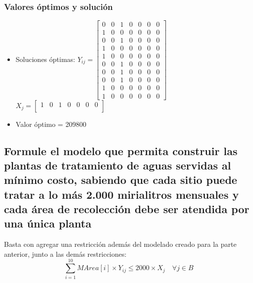 \documentclass[a4paper,12pt]{article}
\begin{document}
\subsubsection{Valores óptimos y solución}
\begin{itemize}
	\item Soluciones óptimas: $Y_{ij}=
	\begin{bmatrix}
	0 & 0 & 1 & 0 & 0 & 0 & 0\\
	1 & 0 & 0 & 0 & 0 & 0 & 0\\
	0 & 0 & 1 & 0 & 0 & 0 & 0\\
	1 & 0 & 0 & 0 & 0 & 0 & 0\\
	1 & 0 & 0 & 0 & 0 & 0 & 0\\
	0 & 0 & 1 & 0 & 0 & 0 & 0\\
	0 & 0 & 1 & 0 & 0 & 0 & 0\\
	0 & 0 & 1 & 0 & 0 & 0 & 0\\
	1 & 0 & 0 & 0 & 0 & 0 & 0\\
	1 & 0 & 0 & 0 & 0 & 0 & 0
	\end{bmatrix}$\\
	
	$X_{j}=
	\begin{bmatrix}
	1 & 0 & 1 & 0 & 0 & 0 & 0\\
	\end{bmatrix}$
	\item Valor óptimo = 209800
\end{itemize}
\subsection{Formule  el  modelo  que  permita  construir  las  plantas  de  tratamiento  de  aguas  servidas  al  mínimo  costo, sabiendo que cada sitio puede  tratar a lo más 2.000 mirialitros mensuales y cada área de recolección debe ser atendida por una única planta}
Basta con agregar una restricción además del modelado creado para la parte anterior, junto a las demás restricciones:
\begin{equation*}
	\sum_{i=1}^{10}MArea[i]\times Y_{ij}\leq 2000\times X_j \quad \forall j \in B
\end{equation*}
\end{document}
